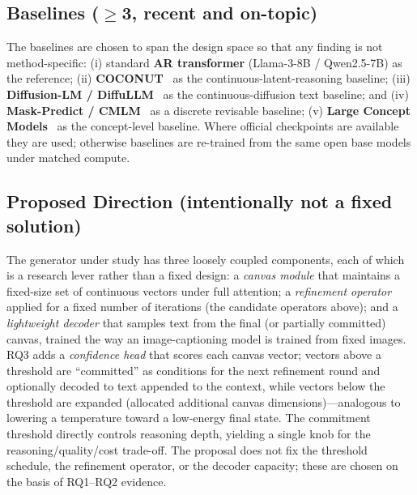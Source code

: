 \documentclass[11pt,a4paper]{article}
\begin{document}
\subsection{Baselines ($\geq$3, recent and on-topic)}
The baselines are chosen to span the design space so that any finding is not method-specific: (i) standard \textbf{AR transformer} (Llama-3-8B / Qwen2.5-7B) as the reference; (ii) \textbf{COCONUT}~\cite{coconut} as the continuous-latent-reasoning baseline; (iii) \textbf{Diffusion-LM / DiffuLLM}~\cite{diffusion_lm,diffullm} as the continuous-diffusion text baseline; and (iv) \textbf{Mask-Predict / CMLM}~\cite{mask_predict} as a discrete revisable baseline; (v) \textbf{Large Concept Models}~\cite{lcm} as the concept-level baseline. Where official checkpoints are available they are used; otherwise baselines are re-trained from the same open base models under matched compute.

\subsection{Proposed Direction (intentionally not a fixed solution)}
The generator under study has three loosely coupled components, each of which is a research lever rather than a fixed design: a \emph{canvas module} that maintains a fixed-size set of continuous vectors under full attention; a \emph{refinement operator} applied for a fixed number of iterations (the candidate operators above); and a \emph{lightweight decoder} that samples text from the final (or partially committed) canvas, trained the way an image-captioning model is trained from fixed images. RQ3 adds a \emph{confidence head} that scores each canvas vector; vectors above a threshold are ``committed'' as conditions for the next refinement round and optionally decoded to text appended to the context, while vectors below the threshold are expanded (allocated additional canvas dimensions)---analogous to lowering a temperature toward a low-energy final state. The commitment threshold directly controls reasoning depth, yielding a single knob for the reasoning/quality/cost trade-off. The proposal does not fix the threshold schedule, the refinement operator, or the decoder capacity; these are chosen on the basis of RQ1--RQ2 evidence.
\end{document}
